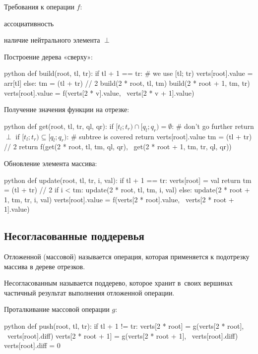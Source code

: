 {\bold Требования} к операции $f$:
\begin{list*}
\item ассоциативность
\item наличие нейтрального элемента $\perp$
\end{list*}
{\bold Построение} дерева {\ital «сверху»}:
\begin{code}{python}
def build(root, tl, tr):
  if tl + 1 == tr: # we use [tl; tr)
    verts[root].value = arr[tl]
  else:
    tm = (tl + tr) // 2
    build(2 * root, tl, tm)
    build(2 * root + 1, tm, tr)
    verts[root].value = f(verts[2 * v].value, \
                          verts[2 * v + 1].value)
\end{code}

{\bold Получение} значения функции на отрезке:
\begin{code}{python}
def get(root, tl, tr, ql, qr):
  if $[t_l;t_r)\cap[q_l;q_r)=\emptyset$: # don't go further
    return $\perp$
  if $[t_l;t_r)\subseteq[q_l;q_r)$: # subtree is covered
    return verts[root].value
  tm = (tl + tr) // 2
  return f(get(2 * root, tl, tm, ql, qr), \
           get(2 * root + 1, tm, tr, ql, qr))
\end{code}

{\bold Обновление} элемента массива:
\begin{code}{python}
def update(root, tl, tr, i, val):
  if tl + 1 == tr:
    verts[root] = val
    return
  tm = (tl + tr) // 2
  if i < tm:
    update(2 * root, tl, tm, i, val)
  else:
    update(2 * root + 1, tm, tr, i, val)
  verts[root].value = f(verts[2 * root].value, \
                        verts[2 * root + 1].value)
\end{code}

\subsection{Несогласованные поддеревья}

{\bold Отложенной} ({\bold массовой}) называется операция, которая применяется к {\ital подотрезку} массива в дереве отрезков.

{\bold Несогласованным} называется поддерево, которое хранит в~своих вершинах {\ital частичный} результат выполнения отложенной операции.

{\bold Проталкивание} массовой операции $g$:
\begin{code}{python}
def push(root, tl, tr):
  if tl + 1 != tr:
    verts[2 * root] = g(verts[2 * root], \
                        verts[root].diff)
    verts[2 * root + 1] = g(verts[2 * root + 1], \
                            verts[root].diff)
  verts[root].diff = 0
\end{code}

